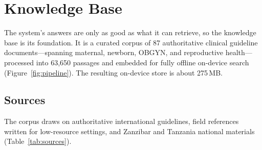 \section{Knowledge Base}
\label{sec:corpus}


The system's answers are only as good as what it can retrieve, so the
knowledge base is its foundation. It is a curated corpus of 87 authoritative
clinical guideline documents---spanning maternal, newborn, OBGYN, and
reproductive health---processed into 63{,}650 passages and embedded for
fully offline on-device search (Figure~\ref{fig:pipeline}). The resulting
on-device store is about 275\,MB.

\subsection{Sources}

The corpus draws on authoritative international guidelines, field references
written for low-resource settings, and Zanzibar and Tanzania national
materials (Table~\ref{tab:sources}).

